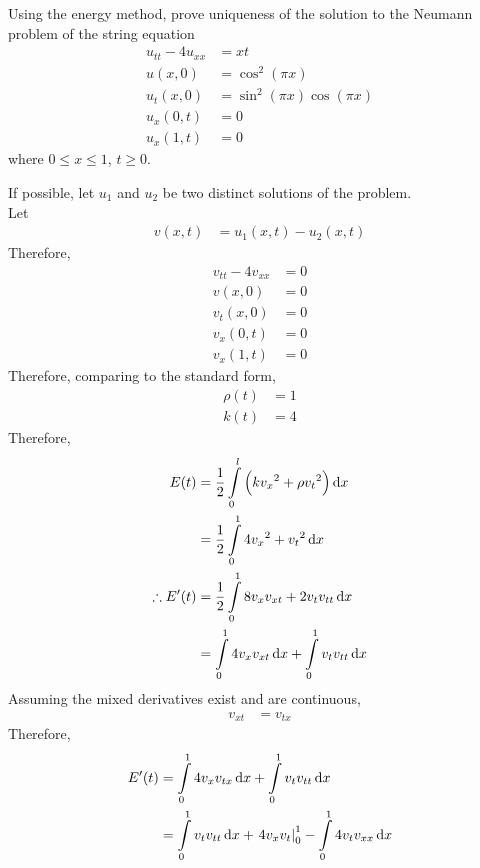\documentclass[fleqn, a4paper, 11pt, oneside]{amsart}
\theoremstyle{definition}
\theoremstyle{theorem}
\begin{document}
\begin{question}
	Using the energy method, prove uniqueness of the solution to the Neumann problem of the string equation
	\begin{align*}
		u_{t t} - 4 u_{x x} &= x t\\
		u(x,0) &= \cos^2(\pi x)\\
		u_t(x,0) &= \sin^2(\pi x) \cos(\pi x)\\
		u_x(0,t) &= 0\\
		u_x(1,t) &= 0
	\end{align*}
	where $0 \le x \le 1$, $t \ge 0$.
\end{question}

\begin{solution}
	If possible, let $u_1$ and $u_2$ be two distinct solutions of the problem.\\
	Let
	\begin{align*}
		v(x,t) &= u_1(x,t) - u_2(x,t)
	\end{align*}
	Therefore,
	\begin{align*}
		v_{t t} - 4 v_{x x} &= 0\\
		v(x,0) &= 0\\
		v_t(x,0) &= 0\\
		v_x(0,t) &= 0\\
		v_x(1,t) &= 0
	\end{align*}
	Therefore, comparing to the standard form,
	\begin{align*}
		\rho(t) &= 1\\
		k(t) &= 4
	\end{align*}
	Therefore,
	\begin{align*}
		E(t) &= \frac{1}{2} \int\limits_{0}^{l} \left( k {v_x}^2 + \rho {v_t}^2 \right) \dif x\\
		&= \frac{1}{2} \int\limits_{0}^{1} 4 {v_x}^2 + {v_t}^2 \dif x\\
		\therefore E'(t) &= \frac{1}{2} \int\limits_{0}^{1} 8 v_x v_{x t} + 2 v_t v_{t t} \dif x\\
		&= \int\limits_{0}^{1} 4 v_x v_{x t} \dif x + \int\limits_{0}^{1} v_t v_{t t} \dif x
	\end{align*}
	Assuming the mixed derivatives exist and are continuous,
	\begin{align*}
		v_{x t} &= v_{t x}
	\end{align*}
	Therefore,
	\begin{align*}
		E'(t) &= \int\limits_{0}^{1} 4 v_x v_{t x} \dif x + \int\limits_{0}^{1} v_t v_{t t} \dif x\\
		&= \int\limits_{0}^{1} v_t v_{t t} \dif x + \left. 4 v_x v_t \right|_{0}^{1} - \int\limits_{0}^{1} 4 v_t v_{x x} \dif x\\

\end{align*}
\end{solution}
\end{document}
